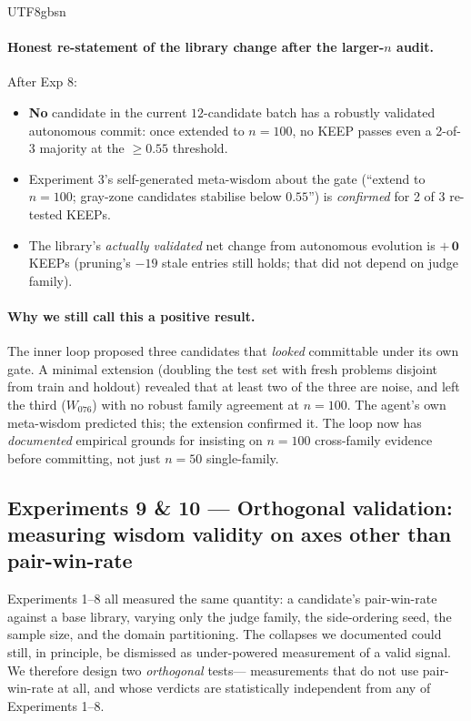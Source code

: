 \documentclass{article}
\begin{document}
\begin{CJK*}{UTF8}{gbsn}
\paragraph{Honest re-statement of the library change after
the larger-\(n\) audit.} After Exp 8:
\begin{itemize}[leftmargin=*, topsep=2pt, itemsep=0pt]
  \item \textbf{No} candidate in the current \(12\)-candidate
    batch has a robustly validated autonomous commit: once
    extended to \(n = 100\), no KEEP passes even a 2-of-3
    majority at the \(\geq 0.55\) threshold.
  \item Experiment 3's self-generated meta-wisdom about the gate
    (``extend to \(n = 100\); gray-zone candidates stabilise
    below \(0.55\)'') is \emph{confirmed} for 2 of 3 re-tested
    KEEPs.
  \item The library's \emph{actually validated} net change from
    autonomous evolution is \(\mathbf{+\,0}\) KEEPs (pruning's
    \(-19\) stale entries still holds; that did not depend on
    judge family).
\end{itemize}

\paragraph{Why we still call this a positive result.} The inner
loop proposed three candidates that \emph{looked} committable
under its own gate. A minimal extension (doubling the test set
with fresh problems disjoint from train and holdout) revealed
that at least two of the three are noise, and left the third
(\(W_{076}\)) with no robust family agreement at \(n = 100\).
The agent's own meta-wisdom predicted this; the extension
confirmed it. The loop now has \emph{documented} empirical
grounds for insisting on \(n = 100\) cross-family evidence
before committing, not just \(n = 50\) single-family.

\subsection{Experiments 9 \& 10 — Orthogonal validation: measuring
wisdom validity on axes other than pair-win-rate}
\label{sec:orthogonal}

Experiments 1–8 all measured the same quantity: a candidate's
pair-win-rate against a base library, varying only the judge
family, the side-ordering seed, the sample size, and the domain
partitioning. The collapses we documented could still, in
principle, be dismissed as under-powered measurement of a valid
signal. We therefore design two \emph{orthogonal} tests—
measurements that do not use pair-win-rate at all, and whose
verdicts are statistically independent from any of Experiments
1–8.


\end{CJK*}
\end{document}
